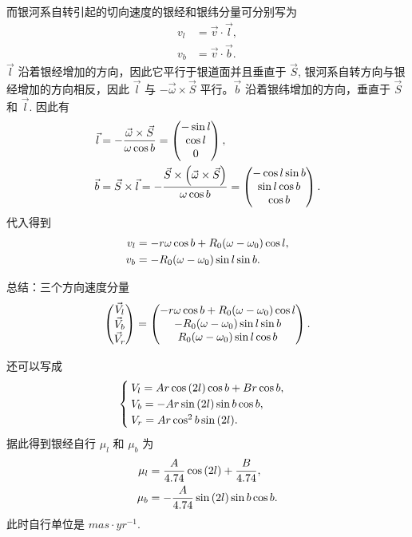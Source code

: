 \documentclass[UTF8, 12pt, a4paper, oneside, onecolumn, fontset=none]{ctexart}
\begin{document}
而银河系自转引起的切向速度的银经和银纬分量可分别写为
\begin{align}
v_{l}&=\vec{v}\cdot\vec{l},\\
v_{b}&=\vec{v}\cdot\vec{b}.
\end{align}
$\vec{l}$ 沿着银经增加的方向，因此它平行于银道面并且垂直于 $\vec{S}$, 银河系自转方向与银经增加的方向相反，因此 $\vec{l}$ 与 $-\vec{\omega}\times\vec{S}$ 平行。$\vec{b}$ 沿着银纬增加的方向，垂直于 $\vec{S}$ 和 $\vec{l}$. 因此有
\begin{align}
\vec{l}&=-\frac{\vec{\omega}\times\vec{S}}{\omega\cos{b}}=\begin{pmatrix}
-\sin{l}\\
\cos{l}\\
0
\end{pmatrix},\\
\vec{b}&=\vec{S}\times\vec{l}=-\frac{\vec{S}\times\mleft(\vec{\omega}\times\vec{S}\mright)}{\omega\cos{b}}=\begin{pmatrix}
-\cos{l}\sin{b}\\
\sin{l}\cos{b}\\
\cos{b}
\end{pmatrix}.
\end{align}
代入得到
\begin{align}
v_{l}&=-r\omega\cos{b}+R_{0}\mleft(\omega-\omega_{0}\mright)\cos{l},\\
v_{b}&=-R_{0}\mleft(\omega-\omega_{0}\mright)\sin{l}\sin{b}.
\end{align}

总结：三个方向速度分量
\begin{equation}
\begin{pmatrix}
\vec{V}_{l}\\
\vec{V}_{b}\\
\vec{V}_{r}
\end{pmatrix}=
\begin{pmatrix}
-r\omega\cos{b}+R_{0}\mleft(\omega-\omega_{0}\mright)\cos{l}\\
-R_{0}\mleft(\omega-\omega_{0}\mright)\sin{l}\sin{b}\\
R_{0}\mleft(\omega-\omega_{0}\mright)\sin{l}\cos{b}
\end{pmatrix}.
\end{equation}

还可以写成
\begin{equation}
\begin{cases}
V_{l}=Ar\cos{\mleft(2l\mright)}\cos{b}+Br\cos{b},\\
V_{b}=-Ar\sin{\mleft(2l\mright)}\sin{b}\cos{b},\\
V_{r}=Ar\cos^{2}{b}\sin{\mleft(2l\mright)}.
\end{cases}
\end{equation}
据此得到银经自行 $\mu_{l}$ 和 $\mu_{b}$ 为
\begin{align}
\mu_{l}&=\frac{A}{4.74}\cos{\mleft(2l\mright)}+\frac{B}{4.74},\\
\mu_{b}&=-\frac{A}{4.74}\sin{\mleft(2l\mright)}\sin{b}\cos{b}.
\end{align}
此时自行单位是 $\unit{mas\cdot{}yr^{-1}}$.
\end{document}
